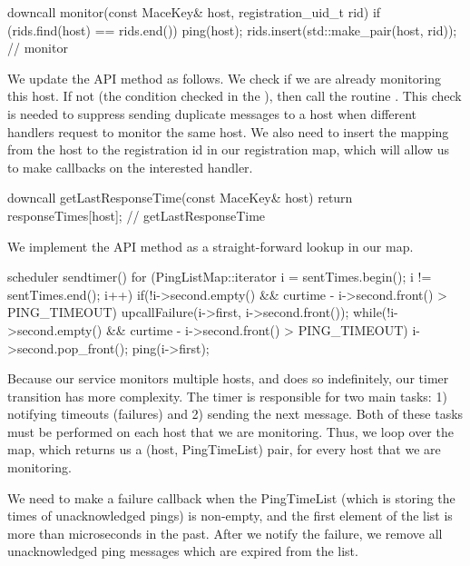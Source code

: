 \begin{programlisting}
    downcall monitor(const MaceKey& host, registration_uid_t rid) {
      if (rids.find(host) == rids.end()) {
        ping(host);
      }
      rids.insert(std::make_pair(host, rid));
    } // monitor
\end{programlisting}

We update the  API method as follows.  We check if
we are already monitoring this host.  If not (the condition checked in
the ), then call the routine .  This
check is needed to suppress sending duplicate  messages
to a host when different handlers request to monitor the same host.
We also need to insert the mapping from the host to the registration
id in our registration map, which will allow us to make callbacks on
the interested handler.


\begin{programlisting}
    downcall getLastResponseTime(const MaceKey& host) {
      return responseTimes[host];
    } // getLastResponseTime
\end{programlisting}

We implement the  API method as a
straight-forward lookup in our map.


\begin{programlisting}
  scheduler sendtimer() {
    for (PingListMap::iterator i = sentTimes.begin(); i != sentTimes.end(); i++) {
      if(!i->second.empty() && curtime - i->second.front() > PING_TIMEOUT) {
	upcallFailure(i->first, i->second.front());
        while(!i->second.empty() && curtime - i->second.front() > PING_TIMEOUT) {
          i->second.pop_front();
        }
      }
      ping(i->first);
    }
  }
\end{programlisting}

Because our service monitors multiple hosts, and does so indefinitely, our
timer transition has more complexity.  The timer is responsible for two main
tasks: 1) notifying timeouts (failures) and 2) sending the next
 message.  Both of these tasks must be performed on each host
that we are monitoring.  Thus, we loop over the  map,
which returns us a (host, PingTimeList) pair, for every host that we are
monitoring.  

We need to make a failure callback when the PingTimeList (which is storing
the times of unacknowledged pings) is non-empty, and the first element
of the list is more than  microseconds in the 
past.  After we notify the failure, we remove all unacknowledged ping messages
which are expired from the list.

